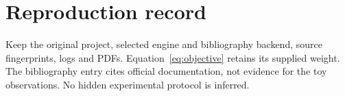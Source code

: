 \section{Reproduction record}\label{sec:appendix}
Keep the original project, selected engine and bibliography backend, source
fingerprints, logs and PDFs. Equation~\eqref{eq:objective} retains its supplied
weight. The bibliography entry cites official documentation, not evidence
for the toy observations. No hidden experimental protocol is inferred.
